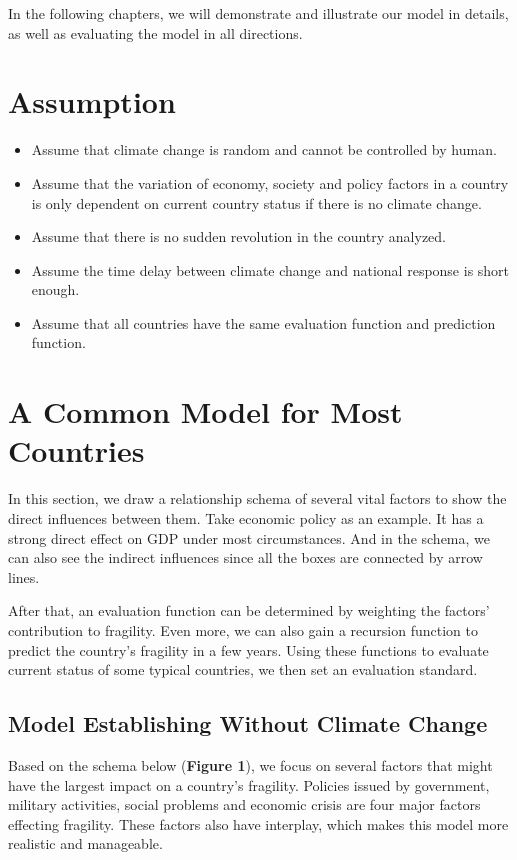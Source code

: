 \documentclass{mcmthesis}
\begin{document}
	In the following chapters, we will demonstrate and illustrate our model in details, as well as evaluating the model in all directions.
	
	\section{Assumption}
	
	\begin{itemize}
		\item Assume that climate change is random and cannot be controlled by human.
		
		\item Assume that the variation of economy, society and policy factors in a country is only dependent on current country status if there is no climate change.
		
		\item Assume that there is no sudden revolution in the country analyzed.
		
		\item Assume the time delay between climate change and national response is short enough.
		
		\item Assume that all countries have the same evaluation function and prediction function.
		
	\end{itemize}
	
	\section{A Common Model for Most Countries}
	In this section, we draw a relationship schema of several vital factors to show the direct influences between them. Take economic policy as an example. It has a strong direct effect on GDP under most circumstances. And in the schema, we can also see the indirect influences since all the boxes are connected by arrow lines.
	
	After that, an evaluation function can be determined by weighting the factors' contribution to fragility. Even more, we can also gain a recursion function to predict the country's fragility in a few years. Using these functions to evaluate current status of some typical countries, we then set an evaluation standard.
	
	\subsection{Model Establishing Without Climate Change}
	Based on the schema below (\textbf{Figure 1}), we focus on several factors that might have the largest impact on a country's fragility. Policies issued by government, military activities, social problems and economic crisis are four major factors effecting fragility. These factors also have interplay, which makes this model more realistic and manageable.
	
\end{document}
